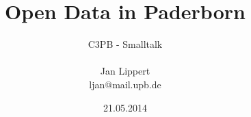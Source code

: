 \documentclass[10pt,a4paper]{beamer}
\author{C3PB - Smalltalk\\
~\\
Jan Lippert\\
ljan@mail.upb.de}
\title{Open Data in Paderborn}
\date{21.05.2014}
\begin{document}
\begin{frame}
\titlepage
\end{frame}

%






\end{document}

